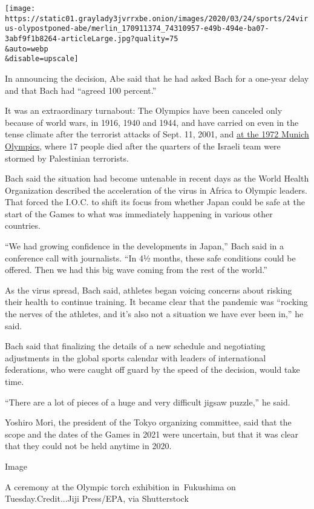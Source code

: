 \texttt{[image: https://static01.graylady3jvrrxbe.onion/images/2020/03/24/sports/24virus-olypostponed-abe/merlin\_170911374\_74310957-e49b-494e-ba07-3abf9f1b8264-articleLarge.jpg?quality=75\\\&auto=webp\\\&disable=upscale]}

In announcing the decision, Abe said that he had asked Bach for a
one-year delay and that Bach had ``agreed 100 percent.''

It was an extraordinary turnabout: The Olympics have been canceled only
because of world wars, in 1916, 1940 and 1944, and have carried on even
in the tense climate after the terrorist attacks of Sept. 11, 2001, and
\href{https://www.nytimes3xbfgragh.onion/2015/12/02/sports/long-hidden-details-reveal-cruelty-of-1972-munich-attackers.html}{at
the 1972 Munich Olympics}, where 17 people died after the quarters of
the Israeli team were stormed by Palestinian terrorists.

Bach said the situation had become untenable in recent days as the World
Health Organization described the acceleration of the virus in Africa to
Olympic leaders. That forced the I.O.C. to shift its focus from whether
Japan could be safe at the start of the Games to what was immediately
happening in various other countries.

``We had growing confidence in the developments in Japan,'' Bach said in
a conference call with journalists. ``In 4½ months, these safe
conditions could be offered. Then we had this big wave coming from the
rest of the world.''

As the virus spread, Bach said, athletes began voicing concerns about
risking their health to continue training. It became clear that the
pandemic was ``rocking the nerves of the athletes, and it's also not a
situation we have ever been in,'' he said.

Bach said that finalizing the details of a new schedule and negotiating
adjustments in the global sports calendar with leaders of international
federations, who were caught off guard by the speed of the decision,
would take time.

``There are a lot of pieces of a huge and very difficult jigsaw
puzzle,'' he said.

Yoshiro Mori, the president of the Tokyo organizing committee, said that
the scope and the dates of the Games in 2021 were uncertain, but that it
was clear that they could not be held anytime in 2020.

Image

A ceremony at the Olympic torch exhibition in~Fukushima on
Tuesday.Credit...Jiji Press/EPA, via Shutterstock

